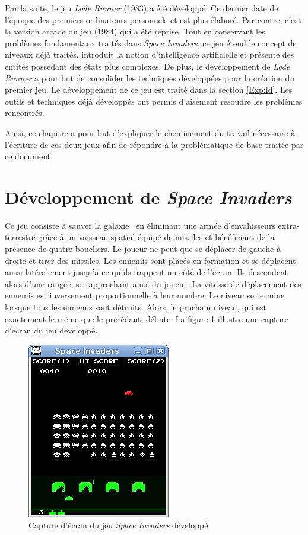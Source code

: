 \documentclass[12pt,twoside,letterpaper,francais]{book}
\begin{document}
Par la suite, le jeu \textit{Lode Runner} (1983) a été développé. Ce
dernier date de l'époque des premiers ordinateurs personnels et est
plus élaboré. Par contre, c'est la version arcade du jeu (1984) qui a
été reprise. Tout en conservant les problèmes fondamentaux traités
dans \textit{Space Invaders}, ce jeu étend le concept de niveaux déjà
traités, introduit la notion d'intelligence artificielle et présente
des entités possédant des états plus complexes. De plus, le
dévelop\-pement de \textit{Lode Runner} a pour but de consolider les
techniques développées pour la création du premier jeu. Le
dévelop\-pement de ce jeu est traité dans la section \ref{Exp:ld}.
Les outils et techniques déjà développés ont permis d'aisément
résoudre les problèmes rencontrés.

Ainsi, ce chapitre a pour but d'expliquer le cheminement du travail
nécessaire à l'écriture de ces deux jeux afin de répondre à la
problématique de base traitée par ce document.


\FloatBarrier
\section{Dévelop\-pement de \textit{Space Invaders}} \label{Exp:SI}
Ce jeu consiste à \og sauver la galaxie \fg~en éliminant une armée
d'envahisseurs extra-terrestre grâce à un vaisseau spatial équipé de
missiles et bénéficiant de la présence de quatre boucliers. Le joueur
ne peut que se déplacer de gauche à droite et tirer des missiles. Les
ennemis sont placés en formation et se déplacent aussi latéralement
jusqu'à ce qu'ils frappent un côté de l'écran. Ils descendent alors
d'une rangée, se rapprochant ainsi du joueur. La vitesse de
déplacement des ennemis est inversement proportionnelle à leur
nombre. Le niveau se termine lorsque tous les ennemis sont
détruits. Alors, le prochain niveau, qui est exactement le même que le
précédant, débute. La figure \ref{Exp:si-screen} illustre une capture
d'écran du jeu développé.\\

\begin{figure}[htb!]
  \center
  \includegraphics[scale=0.7]{space-invaders-screenshot}
  \caption{Capture d'écran du jeu \textit{Space Invaders} développé}
  \label{Exp:si-screen}
\end{figure}
\end{document}
